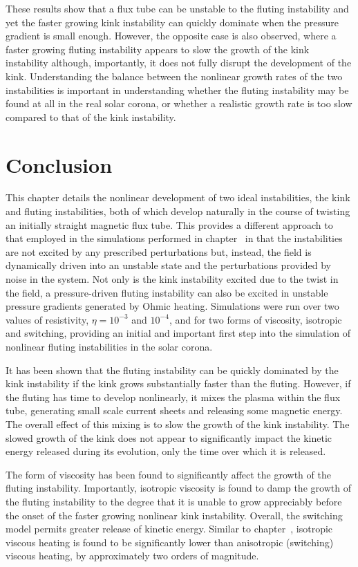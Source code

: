 \documentclass[12pt]{article}
\begin{document}
These results show that a flux tube can be unstable to the fluting instability and yet the faster growing kink instability can quickly dominate when the pressure gradient is small enough. However, the opposite case is also observed, where a faster growing fluting instability appears to slow the growth of the kink instability although, importantly, it does not fully disrupt the development of the kink. Understanding the balance between the nonlinear growth rates of the two instabilities is important in understanding whether the fluting instability may be found at all in the real solar corona, or whether a realistic growth rate is too slow compared to that of the kink instability.

\section{Conclusion}

This chapter details the nonlinear development of two ideal instabilities, the kink and fluting instabilities, both of which develop naturally in the course of twisting an initially straight magnetic flux tube. This provides a different approach to that employed in the simulations performed in chapter~\cite{quinnEffectAnisotropicViscosity2020a} in that the instabilities are not excited by any prescribed perturbations but, instead, the field is dynamically driven into an unstable state and the perturbations provided by noise in the system. Not only is the kink instability excited due to the twist in the field, a pressure-driven fluting instability can also be excited in unstable pressure gradients generated by Ohmic heating. Simulations were run over two values of resistivity, $\eta=10^{-3}$ and $10^{-4}$, and for two forms of viscosity, isotropic and switching, providing an initial and important first step into the simulation of nonlinear fluting instabilities in the solar corona.

It has been shown that the fluting instability can be quickly dominated by the kink instability if the kink grows substantially faster than the fluting. However, if the fluting has time to develop nonlinearly, it mixes the plasma within the flux tube, generating small scale current sheets and releasing some magnetic energy. The overall effect of this mixing is to slow the growth of the kink instability. The slowed growth of the kink does not appear to significantly impact the kinetic energy released during its evolution, only the time over which it is released. 

The form of viscosity has been found to significantly affect the growth of the fluting instability. Importantly, isotropic viscosity is found to damp the growth of the fluting instability to the degree that it is unable to grow appreciably before the onset of the faster growing nonlinear kink instability. Overall, the switching model permits greater release of kinetic energy. Similar to chapter~\cite{quinnEffectAnisotropicViscosity2020a}, isotropic viscous heating is found to be significantly lower than anisotropic (switching) viscous heating, by approximately two orders of magnitude.
\end{document}
